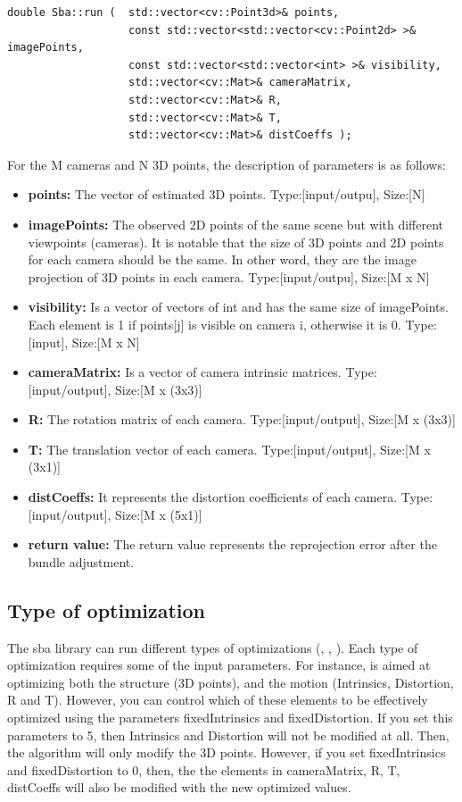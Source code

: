 \begin{lstlisting}
double Sba::run (  std::vector<cv::Point3d>& points,
                   const std::vector<std::vector<cv::Point2d> >& imagePoints,
                   const std::vector<std::vector<int> >& visibility,
                   std::vector<cv::Mat>& cameraMatrix,
                   std::vector<cv::Mat>& R,
                   std::vector<cv::Mat>& T,
                   std::vector<cv::Mat>& distCoeffs );

\end{lstlisting} \label{lst:cvsba}
For the M cameras and N 3D points, the description of parameters is as follows:
\begin{itemize}
\item \textbf{points:} The vector of estimated 3D points. Type:[input/outpu], Size:[N]
\item \textbf{imagePoints:} The observed 2D points of the same scene but with different viewpoints (cameras). It is notable that the size of 3D points and 2D points for each camera should be the same. In other word, they are the image projection of 3D points in each camera. Type:[input/outpu], Size:[M x N]
\item \textbf{visibility:} Is a vector of vectors of int and has the same size of imagePoints. Each element is 1 if points[j] is visible on camera i, otherwise it is 0. Type:[input], Size:[M x N] 
\item \textbf{cameraMatrix:} Is a vector of camera intrinsic matrices. Type:[input/output], Size:[M x (3x3)]
\item \textbf{R:} The rotation matrix of each camera. Type:[input/output], Size:[M x (3x3)]
\item \textbf{T:} The translation vector of each camera. Type:[input/output], Size:[M x (3x1)]
\item \textbf{distCoeffs:} It represents the distortion coefficients of each camera. Type:[input/output], Size:[M x (5x1)]
\item \textbf{return value:} The return value represents the reprojection error after the bundle adjustment.
\end{itemize}

\subsection{Type of optimization} \label{subsec:type_of_optimization}
The sba library can run different types of optimizations (, , ). Each type of optimization requires some of the input parameters. For instance,  is aimed at optimizing both the structure (3D points), and the motion (Intrinsics, Distortion, R and T). However, you can control which of these elements to be effectively optimized using the parameters fixedIntrinsics and fixedDistortion. If you set this parameters to 5, then Intrinsics and Distortion will not be modified at all. Then, the algorithm will only modify the 3D points. However, if you set  fixedIntrinsics and fixedDistortion to 0, then,  the the elements in cameraMatrix, R, T, distCoeffs will also be modified with the new optimized values.

